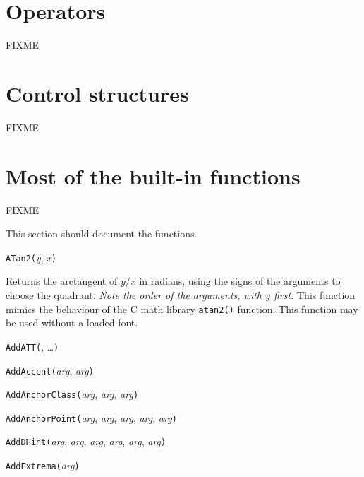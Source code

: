 \section{Operators}

FIXME

\section{Control structures}

FIXME

\section{Most of the built-in functions}

FIXME

This section should document the functions.



\noindent\texttt{ATan2(}\textit{y}, \textit{x}\texttt{)}

Returns the arctangent of $y/x$ in radians, using the signs of the arguments
to choose the quadrant.  \emph{Note the order of the arguments, with $y$
first.}  This function mimics the behaviour of the C math library
\texttt{atan2()} function.  This function may be used without a
loaded font.


\noindent\texttt{AddATT(}, \ldots\texttt{)}


\noindent\texttt{AddAccent(}\textit{arg}, \textit{arg}\texttt{)}


\noindent\texttt{AddAnchorClass(}\textit{arg}, \textit{arg}, \textit{arg}\texttt{)}


\noindent\texttt{AddAnchorPoint(}\textit{arg}, \textit{arg}, \textit{arg}, \textit{arg}, \textit{arg}\texttt{)}


\noindent\texttt{AddDHint(}\textit{arg}, \textit{arg}, \textit{arg}, \textit{arg}, \textit{arg}, \textit{arg}\texttt{)}


\noindent\texttt{AddExtrema(}\textit{arg}\texttt{)}

